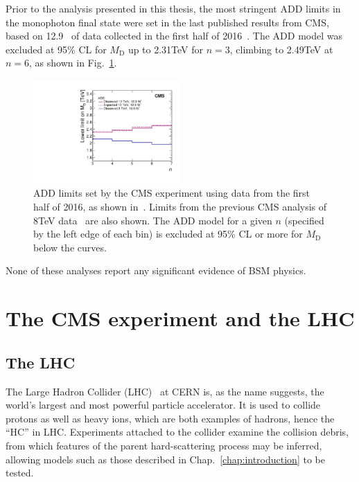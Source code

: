 \documentclass[oneside, letterpaper, 12pt, oldfontcommands]{memoir}
\begin{document}
Prior to the analysis presented in this thesis, the most stringent ADD limits in the monophoton final state were set in the last published results from CMS,
based on 12.9 \fbinv\ of data collected in the first half of 2016~\cite{ref:JHEP10(2017)073}. The ADD model was excluded at 95\% CL for $M_\mathrm{D}$ up to 2.31\unit{TeV}
for $n = 3$, climbing to 2.49\unit{TeV} at $n = 6$, as shown in Fig.~\ref{fig:add_cms_earlylimits_MD}.

\begin{figure}[hbtp]
  \begin{center}
    \includegraphics[width=0.50\textwidth]{Figures/add_cms_earlylimits_MD.pdf}
    \caption{
    ADD limits set by the CMS experiment using data from the first half of 2016, as shown in~\cite{ref:JHEP10(2017)073}.
    Limits from the previous CMS analysis of 8\unit{TeV} data~\cite{ref:j.physletb.2016.01.057} are also shown.
    The ADD model for a given $n$ (specified by the left edge of each bin) is excluded at 95\% CL or more for $M_\mathrm{D}$ below the curves.
    }
    \label{fig:add_cms_earlylimits_MD}
  \end{center}
\end{figure}

None of these analyses report any significant evidence of BSM physics.

\chapter{The CMS experiment and the LHC} \label{chap:LHCCMS}
\section{The LHC} \label{sec:LHCCMS_LHC}
The Large Hadron Collider (LHC)~\cite{ref:1748-0221/3/08/S08001} at CERN is, as the name suggests, the world's largest
and most powerful particle accelerator. It is used to collide protons as well as heavy ions, which are both examples of hadrons, hence the ``HC'' in LHC.
Experiments attached to the collider examine the collision debris, from which features of the
parent hard-scattering process may be inferred, allowing models such as those described in Chap.~\ref{chap:introduction} to be tested.
\end{document}
